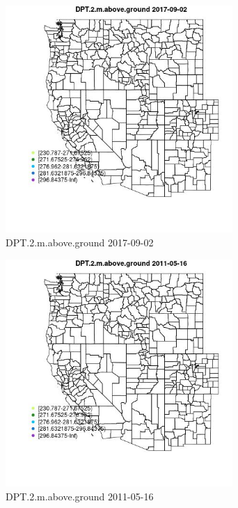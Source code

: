 \begin{figure} 
\centering  
\includegraphics[width=0.77\textwidth]{Code_Outputs/Report_ML_input_PM25_Step4_part_e_de_duplicated_aveswNAs_MapObsDPT2maboveground2017-09-02.jpg} 
\caption{\label{fig:Report_ML_input_PM25_Step4_part_e_de_duplicated_aveswNAsMapObsDPT2maboveground2017-09-02}DPT.2.m.above.ground 2017-09-02} 
\end{figure} 
 

\clearpage 

\begin{figure} 
\centering  
\includegraphics[width=0.77\textwidth]{Code_Outputs/Report_ML_input_PM25_Step4_part_e_de_duplicated_aveswNAs_MapObsDPT2maboveground2011-05-16.jpg} 
\caption{\label{fig:Report_ML_input_PM25_Step4_part_e_de_duplicated_aveswNAsMapObsDPT2maboveground2011-05-16}DPT.2.m.above.ground 2011-05-16} 
\end{figure} 
 


